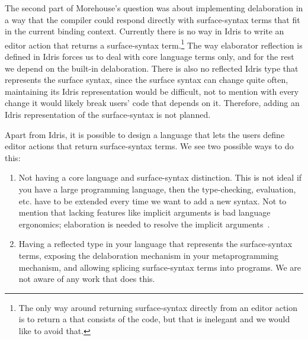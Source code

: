 The second part of Morehouse's question was about implementing delaboration in
a way that the compiler could respond directly with surface-syntax terms that
fit in the current binding context.
Currently there is no way in Idris to write an editor action that returns a
surface-syntax term.\footnote{ The only way around returning surface-syntax
directly from an editor action is to return a  that consists of the
code, but that is inelegant and we would like to avoid that.} The way
elaborator reflection is defined in Idris forces us to deal with core language
terms only, and for the rest we depend on the built-in delaboration.  There is
also no reflected Idris type that represents the surface syntax, since the
surface syntax can change quite often, maintaining its Idris representation
would be difficult, not to mention with every change it would likely break
users' code that depends on it.  Therefore, adding an Idris representation of
the surface-syntax is not planned.

Apart from Idris, it is possible to design a language that lets the users
define editor actions that return surface-syntax terms. We see two possible ways to do this:
\begin{enumerate}
  \item Not having a core language and surface-syntax distinction. This is not
    ideal if you have a large programming language, then the type-checking,
    evaluation, etc. have to be extended every time we want to add a new
    syntax. Not to mention that lacking features like implicit arguments is bad
    language ergonomics; elaboration is needed to resolve the implicit
    arguments~\cite{pollack}.
  \item Having a reflected type in your language that represents the
    surface-syntax terms, exposing the delaboration mechanism in your
    metaprogramming mechanism, and allowing splicing surface-syntax terms into
    programs. We are not aware of any work that does this.
\end{enumerate}
